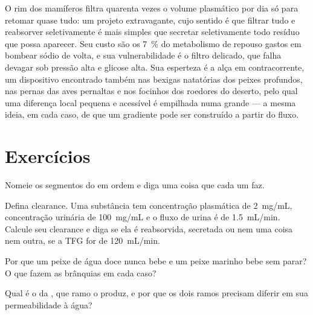 \begin{remark}\label{rem:b3:renal-osmoregulation:design}
O rim dos mamíferos filtra quarenta vezes o volume plasmático por dia só
para retomar quase tudo: um projeto extravagante, cujo sentido é que
filtrar tudo e reabsorver seletivamente é mais simples que secretar
seletivamente todo resíduo que possa aparecer. Seu custo são os
\qty{7}{\%} do metabolismo de repouso gastos em bombear sódio de volta,
e sua vulnerabilidade é o filtro delicado, que falha devagar sob pressão
alta e glicose alta. Sua esperteza é a alça em contracorrente, um
dispositivo encontrado também nas bexigas natatórias dos peixes
profundos, nas pernas das aves pernaltas e nos focinhos dos roedores do
deserto, pelo qual uma diferença local pequena e acessível é empilhada
numa grande --- a mesma ideia, em cada caso, de que um gradiente pode ser
construído a partir do fluxo.
\end{remark}

\section{Exercícios}

\begin{exercise}[$\star$]\label{exo:b3:renal-osmoregulation:1}
Nomeie os segmentos do  em ordem e diga uma coisa que cada um
faz.
\end{exercise}

\begin{exercise}[$\star$]\label{exo:b3:renal-osmoregulation:2}
Defina clearance. Uma substância tem concentração plasmática de
\qty{2}{mg/mL}, concentração urinária de \qty{100}{mg/mL} e o fluxo de
urina é de \qty{1.5}{mL/min}. Calcule seu clearance e diga se ela é
reabsorvida, secretada ou nem uma coisa nem outra, se a TFG for de
\qty{120}{mL/min}.
\end{exercise}

\begin{exercise}[$\star$]\label{exo:b3:renal-osmoregulation:3}
Por que um peixe de água doce nunca bebe e um peixe marinho bebe sem
parar? O que fazem as brânquias em cada caso?
\end{exercise}

\begin{exercise}[$\star$]\label{exo:b3:renal-osmoregulation:4}
Qual é o  da , que ramo o produz, e por que os
dois ramos precisam diferir em sua permeabilidade à água?
\end{exercise}

